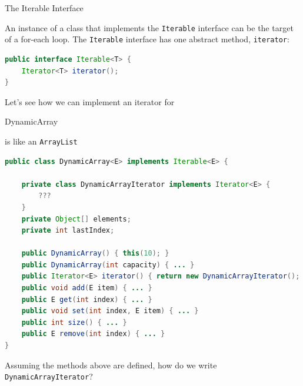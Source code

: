 \documentclass{beamer}
\begin{document}
\begin{frame}[fragile]{The Iterable Interface}

An instance of a class that implements the {\tt Iterable} interface can be the target of a for-each loop.  The {\tt Iterable} interface has one abstract method, {\tt iterator}:

\begin{lstlisting}[language=Java]
public interface Iterable<T> {
    Iterator<T> iterator();
}
\end{lstlisting}

Let's see how we can implement an iterator for 

\end{frame}

\begin{frame}[fragile]{DynamicArray}

 is like an {\tt ArrayList}

\begin{lstlisting}[language=Java]
public class DynamicArray<E> implements Iterable<E> {

    private class DynamicArrayIterator implements Iterator<E> {
        ???
    }
    private Object[] elements;
    private int lastIndex;

    public DynamicArray() { this(10); }
    public DynamicArray(int capacity) { ... }
    public Iterator<E> iterator() { return new DynamicArrayIterator(); }
    public void add(E item) { ... }
    public E get(int index) { ... }
    public void set(int index, E item) { ... }
    public int size() { ... }
    public E remove(int index) { ... }
}
\end{lstlisting}

Assuming the methods above are defined, how do we write {\tt DynamicArrayIterator}?

\end{frame}
\end{document}
